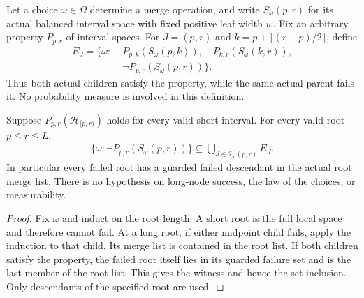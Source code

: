 \begin{definition}
    \label{def:guarded_interval_failure}
    \leanok
    Let a choice $\omega\in\Omega$ determine a merge operation, and write
    $S_\omega(p,r)$ for its actual balanced interval space with fixed
    positive leaf width $w$. Fix an arbitrary property $P_{p,r}$ of
    interval spaces. For $J=(p,r)$ and $k=p+\lfloor(r-p)/2\rfloor$, define
    \begin{align}
        E_J=\{\omega:\; & P_{p,k}(S_\omega(p,k)),\quad
        P_{k,r}(S_\omega(k,r)),\nonumber                 \\
                        & \neg P_{p,r}(S_\omega(p,r))\}.
    \end{align}
    Thus both actual children satisfy the property, while the same actual
    parent fails it. No probability measure is involved in this definition.
\end{definition}

\begin{lemma}
    \label{lem:balanced_interval_failure_ancestry}
    \leanok
    Suppose $P_{p,r}(\mathcal H_{[p,r)})$ holds for every valid short
    interval. For every valid root $p\le r\le L$,
    \begin{align}
        \{\omega:\neg P_{p,r}(S_\omega(p,r))\}
        \subseteq\bigcup_{J\in\mathcal I_w(p,r)}E_J.
    \end{align}
    In particular every failed root has a guarded failed descendant in
    the actual root merge list. There is no hypothesis on long-node success,
    the law of the choices, or measurability.
\end{lemma}
\begin{proof}\leanok
    Fix $\omega$ and induct on the root length. A short root is the full
    local space and therefore cannot fail. At a long root, if either
    midpoint child fails, apply the induction to that child. Its merge
    list is contained in the root list. If both children satisfy the
    property, the failed root itself lies in its guarded failure set and
    is the last member of the root list. This gives the witness and hence
    the set inclusion. Only descendants of the specified root are used.
\end{proof}


